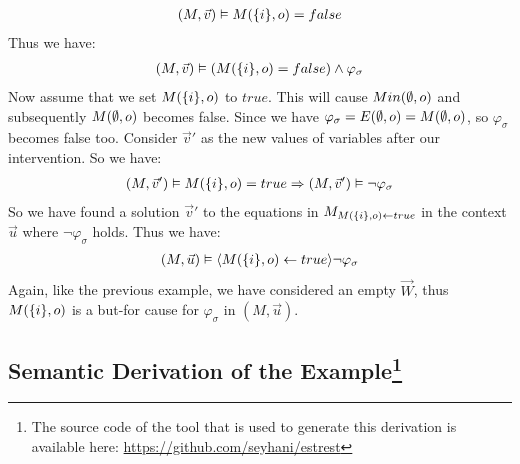 \documentclass{article}
\begin{document}
\begin{example}
\begin{align*}
        (M,\vec v) & \vDash M(\{i\}, o)    = false \\
    \end{align*}
    Thus we have:
    \begin{align*}
        (M,\vec v) \vDash (M(\{i\},o) = false)  \wedge \varphi_{\sigma}
    \end{align*}
    Now assume that we set $M(\{i\},o)$ to $true$.
    This will cause $Min(\emptyset,o)$ and subsequently $M(\emptyset,o)$ becomes false.
    Since we have $\varphi_{\sigma} = E(\emptyset,o) = M(\emptyset,o)$, so
    $\varphi_{\sigma}$ becomes false too.
    Consider $\vec v'$ as the new values of variables after our
    intervention.
    So we have:
    \begin{align*}
        (M,\vec v')\vDash M(\{i\},o) = true
        \Rightarrow
        (M,\vec v') \vDash \neg \varphi_{\sigma}
    \end{align*}
    So we have found a solution $\vec v'$ to the equations in
    $M_{M(\{i\},o)\leftarrow true}$ in the context $\vec u$ where $\neg \varphi_{\sigma}$ holds.
    Thus we have:
    \begin{align*}
        (M,\vec u) \vDash \langle M(\{i\},o) \leftarrow true \rangle \neg \varphi_{\sigma}
    \end{align*}
    Again, like the previous example, we have considered an empty $\vec W$, thus $M(\{i\},o)$ is a but-for cause for $\varphi_{\sigma}$ in $(M,\vec u)$.
\end{example}


\pagebreak
\begin{appendices}
    \section{Semantic Derivation of the Example\protect\footnote[1]
      {The source code of the tool that is used to
          generate this derivation is available here:
          \href{https://github.com/seyhani/estrest}
          {https://github.com/seyhani/estrest}
      }
     }
\end{appendices}
\end{document}
